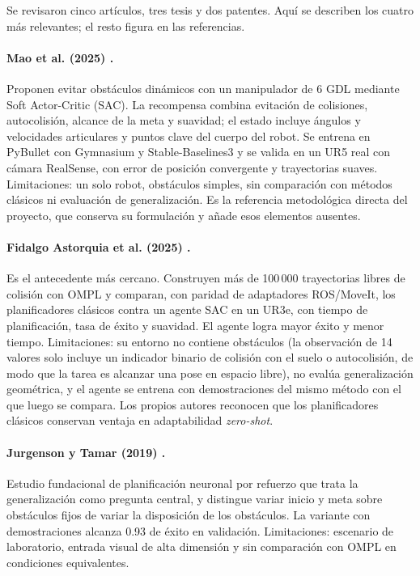 \documentclass[11pt,a4paper,twoside]{article}
\begin{document}
Se revisaron cinco artículos, tres tesis y dos patentes. Aquí se describen los cuatro más relevantes; el resto figura en las referencias.

\paragraph{Mao et al. (2025) \cite{mao2025}.} Proponen evitar obstáculos dinámicos con un manipulador de 6 GDL mediante Soft Actor-Critic (SAC). La recompensa combina evitación de colisiones, autocolisión, alcance de la meta y suavidad; el estado incluye ángulos y velocidades articulares y puntos clave del cuerpo del robot. Se entrena en PyBullet con Gymnasium y Stable-Baselines3 y se valida en un UR5 real con cámara RealSense, con error de posición convergente y trayectorias suaves. Limitaciones: un solo robot, obstáculos simples, sin comparación con métodos clásicos ni evaluación de generalización. Es la referencia metodológica directa del proyecto, que conserva su formulación y añade esos elementos ausentes.

\paragraph{Fidalgo Astorquia et al. (2025) \cite{fidalgo2025}.} Es el antecedente más cercano. Construyen más de 100\,000 trayectorias libres de colisión con OMPL y comparan, con paridad de adaptadores ROS/MoveIt, los planificadores clásicos contra un agente SAC en un UR3e, con tiempo de planificación, tasa de éxito y suavidad. El agente logra mayor éxito y menor tiempo. Limitaciones: su entorno no contiene obstáculos (la observación de 14 valores solo incluye un indicador binario de colisión con el suelo o autocolisión, de modo que la tarea es alcanzar una pose en espacio libre), no evalúa generalización geométrica, y el agente se entrena con demostraciones del mismo método con el que luego se compara. Los propios autores reconocen que los planificadores clásicos conservan ventaja en adaptabilidad \emph{zero-shot}.

\paragraph{Jurgenson y Tamar (2019) \cite{jurgenson2019}.} Estudio fundacional de planificación neuronal por refuerzo que trata la generalización como pregunta central, y distingue variar inicio y meta sobre obstáculos fijos de variar la disposición de los obstáculos. La variante con demostraciones alcanza 0.93 de éxito en validación. Limitaciones: escenario de laboratorio, entrada visual de alta dimensión y sin comparación con OMPL en condiciones equivalentes.
\end{document}
